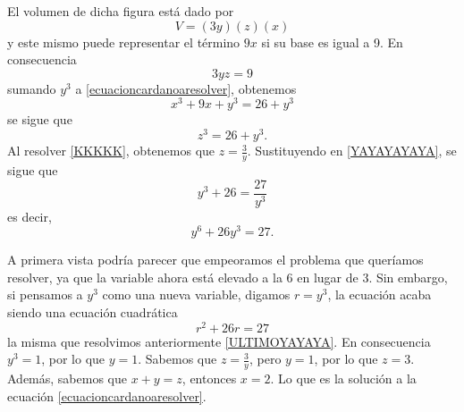 El volumen de dicha figura está dado por
$$V=(3y)(z)(x)$$
y este mismo puede representar el término $9x$ si su base es igual a 9. En consecuencia
\begin{equation}
    3yz=9 \label{KKKKK}
\end{equation}
sumando $y^3$ a \eqref{ecuacioncardanoaresolver}, obtenemos
$$x^3+9x+y^3=26+y^3$$
se sigue que
\begin{equation}
    z^3=26+y^3. \label{YAYAYAYAYA}
\end{equation}
Al resolver \eqref{KKKKK}, obtenemos que $\displaystyle z=\frac{3}{y}$. Sustituyendo en \eqref{YAYAYAYAYA}, se sigue que
$$y^3+26=\frac{27}{y^3}$$
es decir,
$$y^6+26y^3=27.$$

A primera vista podría parecer que empeoramos el problema que queríamos resolver, ya que la variable ahora está elevado a la $6$ en lugar de $3$. Sin embargo, si pensamos a $y^3$ como una nueva variable, digamos $r=y^3$, la ecuación acaba siendo una ecuación cuadrática
$$r^2+26r=27$$
la misma que resolvimos anteriormente \eqref{ULTIMOYAYAYA}. En consecuencia $y^3=1$, por lo que $y=1$. Sabemos que $\displaystyle z = \frac{3}{y}$, pero $y=1$, por lo que $z=3$. Además, sabemos que $x+y=z$, entonces $x=2$. Lo que es la solución a la ecuación \eqref{ecuacioncardanoaresolver}.

